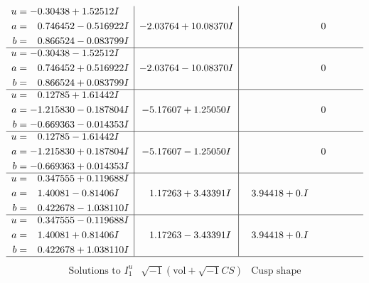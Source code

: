 \documentclass[1p]{elsarticle_modified}
\theoremstyle{definition}
\newcommand{\I}{\sqrt{-1}}
\begin{document}
$$\begin{array}{c|c|c}
\begin{aligned}
u &= -0.30438 + 1.52512 I \\
a &= \phantom{-}0.746452 - 0.516922 I \\
b &= \phantom{-}0.866524 - 0.083799 I\end{aligned}
 & -2.03764 + 10.08370 I & \phantom{-0.000000 } 0 \\ \hline\begin{aligned}
u &= -0.30438 - 1.52512 I \\
a &= \phantom{-}0.746452 + 0.516922 I \\
b &= \phantom{-}0.866524 + 0.083799 I\end{aligned}
 & -2.03764 - 10.08370 I & \phantom{-0.000000 } 0 \\ \hline\begin{aligned}
u &= \phantom{-}0.12785 + 1.61442 I \\
a &= -1.215830 - 0.187804 I \\
b &= -0.669363 - 0.014353 I\end{aligned}
 & -5.17607 + 1.25050 I & \phantom{-0.000000 } 0 \\ \hline\begin{aligned}
u &= \phantom{-}0.12785 - 1.61442 I \\
a &= -1.215830 + 0.187804 I \\
b &= -0.669363 + 0.014353 I\end{aligned}
 & -5.17607 - 1.25050 I & \phantom{-0.000000 } 0 \\ \hline\begin{aligned}
u &= \phantom{-}0.347555 + 0.119688 I \\
a &= \phantom{-}1.40081 - 0.81406 I \\
b &= \phantom{-}0.422678 - 1.038110 I\end{aligned}
 & \phantom{-}1.17263 + 3.43391 I & \phantom{-}3.94418 + 0. I\phantom{ +0.000000I} \\ \hline\begin{aligned}
u &= \phantom{-}0.347555 - 0.119688 I \\
a &= \phantom{-}1.40081 + 0.81406 I \\
b &= \phantom{-}0.422678 + 1.038110 I\end{aligned}
 & \phantom{-}1.17263 - 3.43391 I & \phantom{-}3.94418 + 0. I\phantom{ +0.000000I}\\
 \hline 
 \end{array}$$\newpage$$\begin{array}{c|c|c}  
\text{Solutions to }I^u_{1}& \I (\text{vol} + \sqrt{-1}CS) & \text{Cusp shape}\\

\end{array}$$
\end{document}
